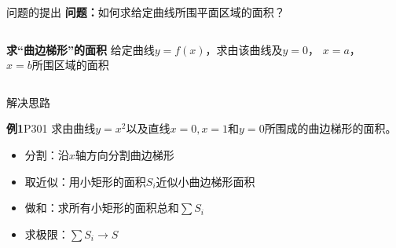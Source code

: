 \begin{frame}{问题的提出}
	\linespread{1.2}\pause 
	{\bf 问题：}如何求给定曲线所围平面区域的面积？\pause 
	\begin{columns}
		\begin{block}{\bf 求“曲边梯形”的面积}
			给定曲线$y=f(x)$，求由该曲线及$y=0$，
			$x=a$，\\
			$x=b$所围区域的面积
		\end{block}
		\begin{center}
		\end{center}
	\end{columns}
\end{frame}

\begin{frame}{解决思路}
	\linespread{1.2}\pause 
	\begin{exampleblock}{{\bf 例1}\hfill P301}
		求由曲线$y=x^2$以及直线$x=0,x=1$和$y=0$所围成的曲边梯形的面积。
	\end{exampleblock}\pause 
	\begin{itemize}
	  \item {\bb 分割：}沿$x$轴方向分割曲边梯形\pause 
	  \item {\bb 取近似：}用小矩形的面积$S_i$近似小曲边梯形面积\pause 
	  \item {\bb 做和：}求所有小矩形的面积总和$\sum S_i$\pause 
	  \item {\bb 求极限：}$\sum S_i\to S$
	\end{itemize}
\end{frame}

